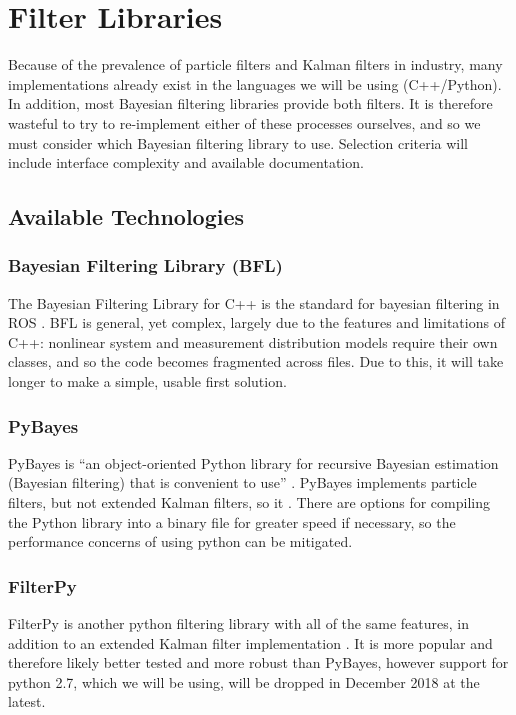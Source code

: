 \documentclass[10pt,draftclsnofoot,onecolumn]{article}
\begin{document}
\section{Filter Libraries}

Because of the prevalence of particle filters and Kalman filters in industry, many implementations already exist in the languages we will be using (C++/Python). In addition, most Bayesian filtering libraries provide both filters. It is therefore wasteful to try to re-implement either of these processes ourselves, and so we must consider which Bayesian filtering library to use. Selection criteria will include interface complexity and available documentation.

\subsection{Available Technologies}
\subsubsection{Bayesian Filtering Library (BFL)}

The Bayesian Filtering Library for C++ is the standard for bayesian filtering in ROS \cite{bfl-url}. BFL is general, yet complex, largely due to the features and limitations of C++: nonlinear system and measurement distribution models require their own classes, and so the code becomes fragmented across files. Due to this, it will take longer to make a simple, usable first solution.

\subsubsection{PyBayes}

PyBayes is “an object-oriented Python library for recursive Bayesian estimation (Bayesian filtering) that is convenient to use” \cite{pybayes-doc}. PyBayes implements particle filters, but not extended Kalman filters, so it . There are options for compiling the Python library into a binary file for greater speed if necessary, so the performance concerns of using python can be mitigated.

\subsubsection{FilterPy}

FilterPy is another python filtering library with all of the same features, in addition to an extended Kalman filter implementation \cite{filterpy-doc}. It is more popular and therefore likely better tested and more robust than PyBayes, however support for python 2.7, which we will be using, will be dropped in December 2018 at the latest. 
\end{document}
